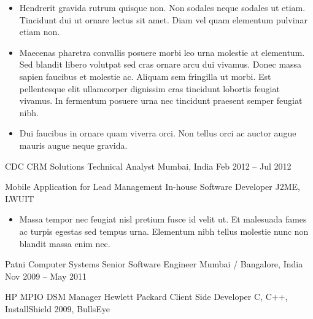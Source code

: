 \documentclass[10pt, a4paper]{cvhari}
\begin{document}
        \begin{itemize}
            \item Hendrerit gravida rutrum quisque non. Non sodales neque sodales ut etiam. Tincidunt dui ut ornare lectus sit amet. Diam vel quam elementum pulvinar etiam non.\smallskip
            \item  Maecenas pharetra convallis posuere morbi leo urna molestie at elementum. Sed blandit libero volutpat sed cras ornare arcu dui vivamus. Donec massa sapien faucibus et molestie ac. Aliquam sem fringilla ut morbi. Est pellentesque elit ullamcorper dignissim cras tincidunt lobortis feugiat vivamus. In fermentum posuere urna nec tincidunt praesent semper feugiat nibh.\smallskip
            \item  Dui faucibus in ornare quam viverra orci. Non tellus orci ac auctor augue mauris augue neque gravida.\smallskip
        \end{itemize}


\smallskip
\divider
\smallskip

    \company
        {CDC CRM Solutions}
        {Technical Analyst}
        {Mumbai, India}
        {Feb 2012 – Jul 2012}
        
        \project
            {Mobile Application for Lead Management}
            {In-house}
            {Software Developer}
            {J2ME, LWUIT}
    
        \begin{itemize}
            \item Massa tempor nec feugiat nisl pretium fusce id velit ut. Et malesuada fames ac turpis egestas sed tempus urna. Elementum nibh tellus molestie nunc non blandit massa enim nec.\smallskip
        \end{itemize}

\smallskip
\divider
\smallskip

    \company
        {Patni Computer Systems}
        {Senior Software Engineer}
        {Mumbai / Bangalore, India}
        {Nov 2009 – May 2011}
        
        \project
            {HP MPIO DSM Manager}
            {Hewlett Packard}
            {Client Side Developer}
            {C, C++, InstallShield 2009, BullsEye}
    
\end{document}
